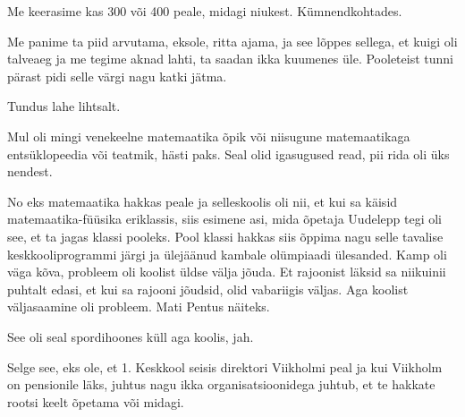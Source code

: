 
Me keerasime kas 300 või 400 peale, midagi niukest. Kümnendkohtades.

Me panime ta piid arvutama, eksole, ritta ajama, ja see lõppes sellega, et kuigi oli talveaeg ja me tegime aknad lahti, ta saadan ikka kuumenes üle. Pooleteist tunni pärast pidi selle värgi nagu katki jätma.
                 

Tundus lahe lihtsalt.

                 
Mul oli mingi venekeelne matemaatika õpik või niisugune matemaatikaga entsüklopeedia või teatmik, hästi paks. Seal olid igasugused read, pii rida oli üks nendest.


No eks matemaatika hakkas peale ja selleskoolis oli nii, et kui sa käisid matemaatika-füüsika eriklassis, siis esimene asi, mida õpetaja Uudelepp tegi oli see, et ta jagas klassi pooleks. Pool klassi hakkas siis õppima nagu selle tavalise keskkooliprogrammi järgi ja ülejäänud kambale olümpiaadi ülesanded. Kamp oli väga kõva, probleem oli koolist üldse välja jõuda. Et rajoonist läksid sa niikuinii puhtalt edasi, et kui sa rajooni jõudsid, olid vabariigis väljas. Aga koolist väljasaamine oli probleem. Mati Pentus näiteks. 
               

See oli seal spordihoones küll aga koolis, jah. 


Selge see, eks ole, et 1. Keskkool seisis direktori Viikholmi peal ja kui Viikholm on pensionile läks,  juhtus nagu ikka organisatsioonidega juhtub, et te hakkate rootsi keelt õpetama või midagi.

